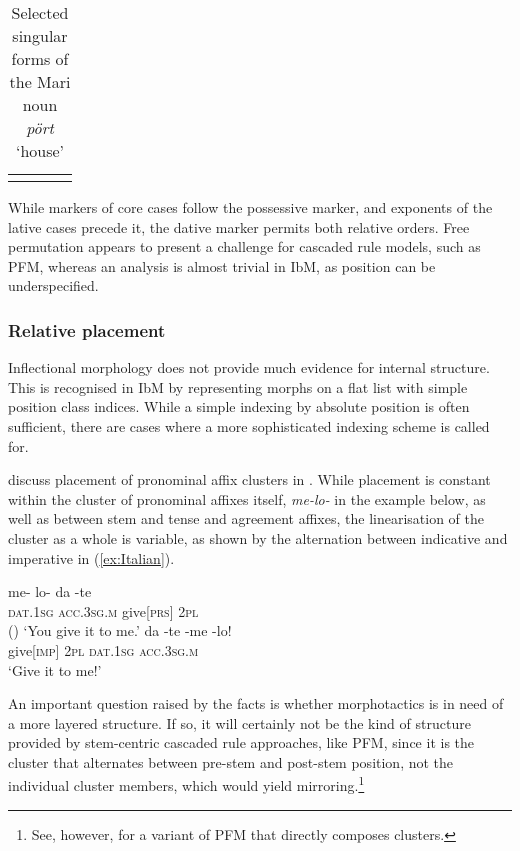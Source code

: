 \documentclass[output=paper,biblatex,babelshorthands,newtxmath,draftmode,colorlinks,citecolor=brown]{langscibook}
\begin{document}
\begin{exe}
\begin{xlist}
\begin{exe}
\begin{xlist}
\begin{table}
\begin{tabular}{llll}
    \lspbottomrule
  \end{tabular}
  
  \caption{Selected singular forms of the Mari noun \emph{pört} `house'}
  \label{tab:MariSingular}
\end{table}

\largerpage[2]
While markers of core cases follow the possessive marker, and
exponents of the lative cases precede it, the dative marker permits
both relative orders. Free permutation appears to present a 
challenge for cascaded rule models, such as PFM, whereas an analysis is almost
trivial in IbM, as position can be underspecified. 

\subsubsection*{Relative placement}

Inflectional morphology does not provide much evidence for internal
structure. This is recognised in IbM by representing morphs on a flat
list with simple position class indices. While a simple indexing by
absolute position is often sufficient, there are cases where a more
sophisticated indexing scheme is called
for.

\citet{Crysmann:Bonami:2016} discuss placement of pronominal affix
clusters in . While placement is constant within the cluster of
pronominal affixes
itself, \textit{me-lo-} in the example below, as well as
between stem and tense and agreement affixes, the linearisation of the
cluster as a whole is variable, as shown by the alternation between
indicative and imperative in (\ref{ex:Italian}).

\begin{exe}
  \ex\label{ex:Italian}
  \begin{xlist}
    \ex\gll me- lo- da -te\\
    \textsc{dat.1sg} \textsc{acc.3sg.m} give[\textsc{prs}] \textsc{2pl}\\\hfill()
    \glt `You give it to me.'
    \ex\gll da -te -me -lo!\\
    give[\textsc{imp}] \textsc{2pl} \textsc{dat.1sg} \textsc{acc.3sg.m}\\
    \glt `Give it to me!'
  \end{xlist}
\end{exe}

An important question raised by the  facts is whether
morphotactics is in need of a more layered structure. If so, it will
certainly not be the kind of structure provided by stem-centric
cascaded rule approaches, like PFM, since it is the cluster that
alternates between pre-stem and post-stem position, not the individual
cluster members, which would yield mirroring.\footnote{See, however,
  \citet{Spencer05} for a variant of PFM that directly composes
  clusters.}


\end{xlist}
\end{exe}
\end{xlist}
\end{exe}
\end{document}
